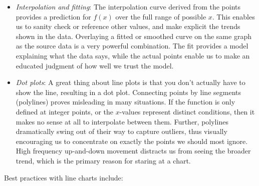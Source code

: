 \documentclass[10pt]{article}
\begin{document}
\begin{itemize}
  \item \textit{Interpolation and fitting}: The interpolation curve derived from the points provides a prediction for \( f(x) \) over the full range of possible \( x \). This enables us to sanity check or reference other values, and make explicit the trends shown in the data. Overlaying a fitted or smoothed curve on the same graph as the source data is a very powerful combination. The fit provides a model explaining what the data says, while the actual points enable us to make an educated judgment of how well we trust the model.
  \item \textit{Dot plots}: A great thing about line plots is that you don't actually have to show the line, resulting in a dot plot. Connecting points by line segments (polylines) proves misleading in many situations. If the function is only defined at integer points, or the \( x \)-values represent distinct conditions, then it makes no sense at all to interpolate between them. Further, polylines dramatically swing out of their way to capture outliers, thus visually encouraging us to concentrate on exactly the points we should most ignore. High frequency up-and-down movement distracts us from seeing the broader trend, which is the primary reason for staring at a chart.
\end{itemize}

Best practices with line charts include:
\end{document}
